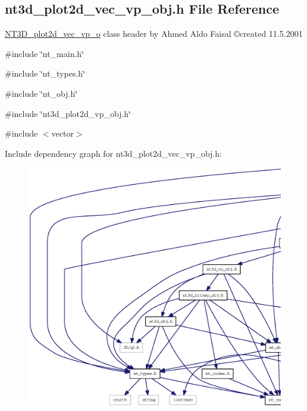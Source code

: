 \subsection{nt3d\_\-plot2d\_\-vec\_\-vp\_\-obj.h File Reference}
\label{nt3d__plot2d__vec__vp__obj_8h}



\begin{DoxyItemize}
\item \hyperlink{class_n_t3_d__plot2d__vec__vp__o}{NT3D\_\-plot2d\_\-vec\_\-vp\_\-o} class header by Ahmed Aldo Faisal \copyright created 11.5.2001 
\end{DoxyItemize} 


{\ttfamily \#include \char`\"{}nt\_\-main.h\char`\"{}}\par
{\ttfamily \#include \char`\"{}nt\_\-types.h\char`\"{}}\par
{\ttfamily \#include \char`\"{}nt\_\-obj.h\char`\"{}}\par
{\ttfamily \#include \char`\"{}nt3d\_\-plot2d\_\-vp\_\-obj.h\char`\"{}}\par
{\ttfamily \#include $<$vector$>$}\par
Include dependency graph for nt3d\_\-plot2d\_\-vec\_\-vp\_\-obj.h:
\nopagebreak
\begin{figure}[H]
\begin{center}
\leavevmode
\includegraphics[width=400pt]{nt3d__plot2d__vec__vp__obj_8h__incl}
\end{center}
\end{figure}
